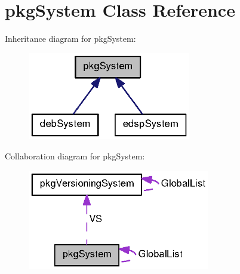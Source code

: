 \section{pkg\-System \-Class \-Reference}
\label{classpkgSystem}


\-Inheritance diagram for pkg\-System\-:
\nopagebreak
\begin{figure}[H]
\begin{center}
\leavevmode
\includegraphics[width=202pt]{classpkgSystem__inherit__graph}
\end{center}
\end{figure}


\-Collaboration diagram for pkg\-System\-:
\nopagebreak
\begin{figure}[H]
\begin{center}
\leavevmode
\includegraphics[width=225pt]{classpkgSystem__coll__graph}
\end{center}
\end{figure}
